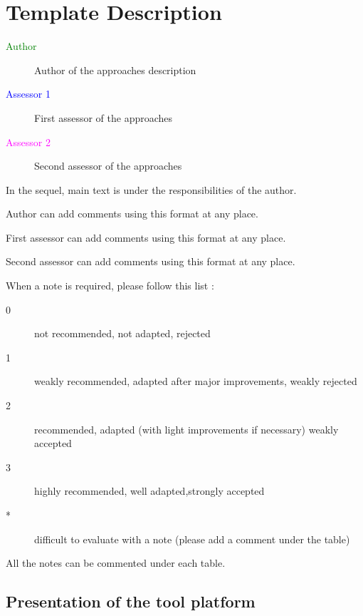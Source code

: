 \chapter{Template Description}
\label{sec:template}

\begin{description}
\item[\textcolor{green}{Author}] Author of the approaches description  
\item[\textcolor{blue}{Assessor 1}] First assessor of the approaches 
\item[\textcolor{magenta}{Assessor 2}] Second assessor of the approaches 
\end{description}

In the sequel, main text is under the responsibilities of the author.

\begin{author_comment}
Author can add comments using this format at any place.
\end{author_comment}

\begin{assessor1}
First assessor can add comments using this format at any place.
\end{assessor1}

\begin{assessor2}
Second assessor can add comments using this format at any place.
\end{assessor2}

When a note is required, please follow this list :
\begin{description}
\item[0] not recommended, not adapted, rejected
\item[1] weakly recommended, adapted after major improvements, weakly rejected
\item[2] recommended, adapted (with light improvements if necessary)  weakly accepted
\item[3] highly recommended, well adapted,strongly accepted
\item[*] difficult to evaluate with a note (please add a comment under the table)
\end{description}

All the notes can be commented under each table.

\section{Presentation of the tool platform}

